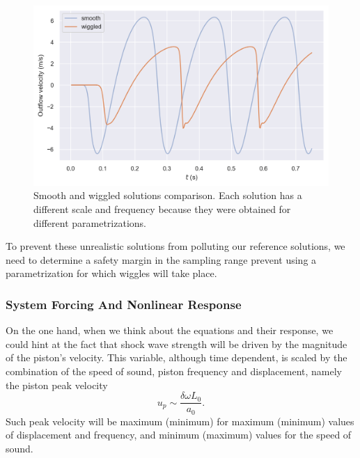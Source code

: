 \documentclass[../../thesis.tex]{subfiles}
\begin{document}
\begin{figure}[h]
    \centering
    \includegraphics[width=1\columnwidth]{research_project/piston/figures/wiggles/smooth_vs_wiggled.png}
    \caption{Smooth and wiggled solutions comparison.
    Each solution has a different scale and frequency because they were obtained for different parametrizations.}
    \label{fig:smooth_vs_wiggled}
\end{figure}
To prevent these unrealistic solutions from polluting our reference solutions, we
need to determine a safety margin in the sampling range prevent using a parametrization for which wiggles will take place.


\subsubsection{System Forcing And Nonlinear Response}
\label{sec:fom_calibration_system_forcing}
On the one hand, when we think about the equations and their response, we could hint at the fact that shock wave strength will be driven by the magnitude of the piston's velocity.
This variable, although time dependent, is scaled by the combination of the speed of sound,
piston frequency and displacement, 
namely the piston peak velocity
\begin{equation}
    u_p \sim \frac{\delta \omega L_0}{a_0}.
\end{equation}
Such peak velocity will be maximum (minimum) for maximum (minimum) values of displacement and frequency, and minimum (maximum) values for the speed of sound.
\end{document}
